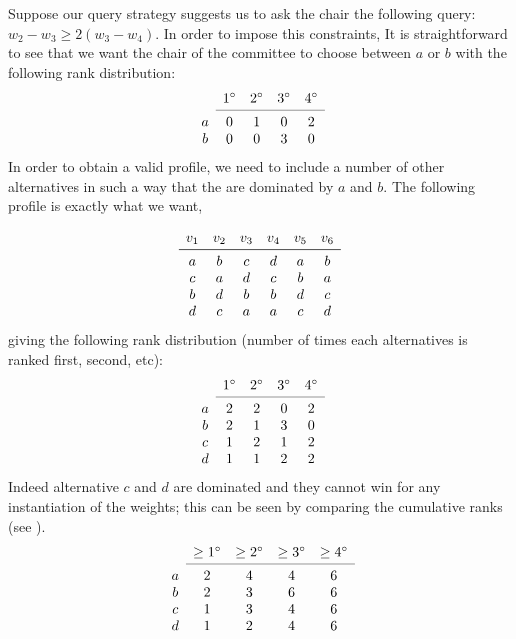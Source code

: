 \begin{example}
Suppose our query strategy suggests us to ask the chair the following query: $w_{2} - w_{3} \geq 2(w_{3} - w_{4})$.
In order to impose this constraints,
It is straightforward to see that we want the  chair of the committee to choose between $a$ or $b$ with the following rank distribution:
\[
\begin{array}{ccccc}
& 1^\circ
& 2^\circ
& 3^\circ
& 4^\circ \\
\cmidrule{2-5}
a & 0& 1& 0& 2 \\
b& 0& 0& 3& 0 \\
\end{array}
\]
In order to obtain a valid profile, we need to include a number of other alternatives in such a way that the are dominated by $a$ and $b$.
The following profile is exactly what we want,

\[
\begin{array}{cccccc}
v_1& v_2& v_3 & v_4& v_5& v_6 \\
\midrule 
a& b& c & d& a& b \\
c& a& d& c& b& a \\
b& d& b& b& d& c \\
d& c& a& a& c& d \\
\end{array}
\]
giving the following rank distribution (number of times each alternatives is ranked first, second, etc): 
\[
\begin{array}{ccccc}
& 1^\circ& 2^\circ& 3^\circ& 4^\circ \\
\cmidrule{2-5}
a & 2& 2& 0& 2 \\
b& 2& 1& 3& 0 \\
c& 1& 2& 1& 2 \\
d& 1& 1& 2& 2 \\
\end{array}
\]
Indeed alternative $c$ and $d$ are dominated and they cannot win for any instantiation of the weights; this can be seen by comparing the cumulative ranks (see  \citep{Stein1994}).
\[
\begin{array}{ccccc}
& \geq 1^\circ
& \geq 2^\circ
& \geq 3^\circ
& \geq 4^\circ \\
\cmidrule{2-5}
a & 2 & 4& 4& 6 \\
b & 2 & 3& 6& 6 \\
c& 1& 3& 4& 6 \\
d& 1& 2& 4& 6 \\
\end{array}
\]
\end{example}



